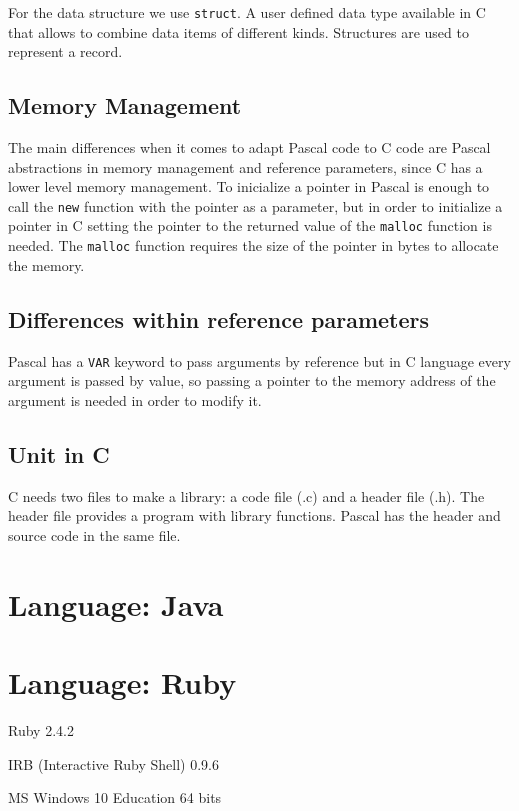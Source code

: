 \documentclass[11pt]{scrartcl} %
\begin{document}
For the data structure we use \texttt{struct}. A user defined data type available in C that allows to combine data items of different kinds. Structures are used to represent a record. 

\subsection*{Memory Management}

The main differences when it comes to adapt Pascal code to C code are Pascal abstractions in memory management and reference parameters, since C has a lower level memory management. To inicialize a pointer in Pascal is enough to call the \texttt{new} function with the pointer as a parameter, but in order to initialize a pointer in C setting the pointer to the returned value of the \texttt{malloc} function is needed. The \texttt{malloc} function requires the size of the pointer in bytes to allocate the memory.

\subsection*{Differences within reference parameters}

Pascal has a \texttt{VAR} keyword to pass arguments by reference but in C language every argument is passed by value, so passing a pointer to the memory address of the argument is needed in order to modify it.

\subsection*{Unit in C}

C needs two files to make a library: a code file (.c) and a header file (.h). The header file provides a program with library functions.
Pascal has the header and source code in the same file.

\section{Language: Java}
\section{Language: Ruby}

\begin{description}[align=left,labelwidth=10em]
\item [Language Version] Ruby 2.4.2
\item [Interpreter] IRB (Interactive Ruby Shell) 0.9.6
\item [Operating System] MS Windows 10 Education 64 bits
\end{description}
\end{document}
